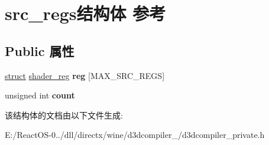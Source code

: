 \hypertarget{structsrc__regs}{}\section{src\+\_\+regs结构体 参考}
\label{structsrc__regs}
\subsection*{Public 属性}
\begin{DoxyCompactItemize}
\item 
\mbox{\label{structsrc__regs_ad0165cf7334684cf0ec97a49c390c25e}} 
\hyperlink{interfacestruct}{struct} \hyperlink{structshader__reg}{shader\+\_\+reg} {\bfseries reg} \mbox{[}M\+A\+X\+\_\+\+S\+R\+C\+\_\+\+R\+E\+GS\mbox{]}
\item 
\mbox{\label{structsrc__regs_aab112f6db505b22ee5bc8f30efbcdf6a}} 
unsigned int {\bfseries count}
\end{DoxyCompactItemize}


该结构体的文档由以下文件生成\+:\begin{DoxyCompactItemize}
\item 
E\+:/\+React\+O\+S-\/0../dll/directx/wine/d3dcompiler\+\_/d3dcompiler\+\_\+private.\+h\end{DoxyCompactItemize}
